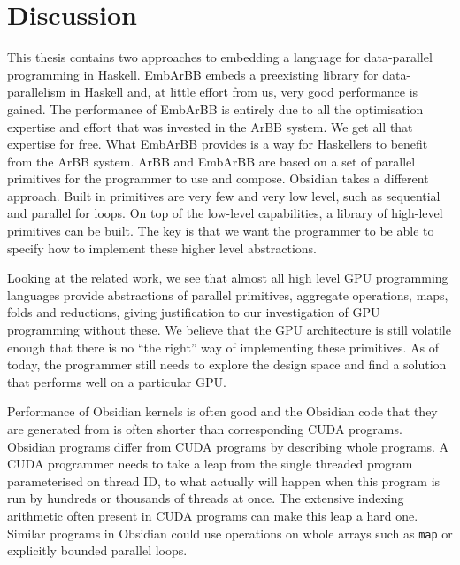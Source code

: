 \documentclass[a4paper]{book}
\begin{document}
\section{Discussion} 




This thesis contains two approaches to embedding a language for data-parallel programming 
in Haskell. EmbArBB embeds a preexisting library for data-parallelism in Haskell 
and, at little effort from us, very good performance is gained. The performance of 
EmbArBB is entirely due to all the optimisation expertise and effort that was invested in 
the ArBB system. We get all that expertise for free. What EmbArBB provides is a 
way for Haskellers to benefit from the ArBB system. ArBB and EmbArBB are based on a 
set of parallel primitives for the programmer to use and compose. Obsidian takes 
a different approach. Built in primitives are very few and very low level, such as 
sequential and parallel for loops. On top of the low-level capabilities, a library 
of high-level primitives can be built. The key is that we want the programmer to 
be able to specify how to implement these higher level abstractions. 

Looking at the related work, we see that almost all high level GPU programming 
languages provide abstractions of parallel primitives, aggregate operations, 
maps, folds and reductions, giving justification to our investigation of GPU 
programming without these. We believe that the GPU architecture is still volatile 
enough that there is no ``the right'' way of implementing these primitives. As of 
today, the programmer still needs to explore the design space and find a solution 
that performs well on a particular GPU. 

Performance of Obsidian kernels is often good and the Obsidian code that they 
are generated from is often shorter than corresponding CUDA programs. Obsidian 
programs differ from CUDA programs by describing whole programs. A CUDA programmer 
needs to take a leap from the single threaded program 
parameterised on thread ID, to what actually will happen when this program is 
run by hundreds or thousands of threads at once. The extensive indexing arithmetic 
often present in CUDA programs can make this leap a hard one. Similar programs 
in Obsidian could use operations on whole arrays such as {\tt map} or explicitly 
bounded parallel loops. 
\end{document}
